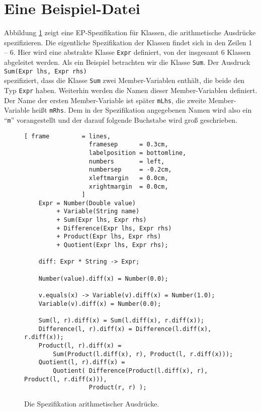 \section{Eine Beispiel-Datei}
Abbildung \ref{fig:expr.ep} zeigt eine EP-Spezifikation f\"ur Klassen, die arithmetische Ausdr\"ucke
spezifizieren.   Die eigentliche Spezifikation der Klassen findet sich in den Zeilen 1 -- 6.
Hier wird eine abstrakte Klasse \texttt{Expr} definiert, von der insgesamt 6 Klassen abgeleitet
werden.  Als ein Beispiel betrachten wir die Klasse \texttt{Sum}.  Der Ausdruck
\\[0.2cm]
\hspace*{1.3cm}
\texttt{Sum(Expr lhs, Expr rhs)}
\\[0.2cm]
spezifiziert, dass die Klasse \texttt{Sum} zwei Member-Variablen enth\"alt, die beide den Typ
\texttt{Expr} haben.  Weiterhin werden die Namen dieser Member-Variablen definiert.  Der Name der
ersten Member-Variable ist sp\"ater \texttt{mLhs}, die zweite Member-Variable hei{\ss}t \texttt{mRhs}.
Dem in der Spezifikation angegebenen Namen wird also ein ``\texttt{m}'' vorangestellt und der darauf
folgende Buchstabe wird gro{\ss} geschrieben.

\begin{figure}[thb]
  \centering
\begin{Verbatim}[ frame         = lines, 
                  framesep      = 0.3cm, 
                  labelposition = bottomline,
                  numbers       = left,
                  numbersep     = -0.2cm,
                  xleftmargin   = 0.0cm,
                  xrightmargin  = 0.0cm,
                ]
    Expr = Number(Double value)
         + Variable(String name)
         + Sum(Expr lhs, Expr rhs) 
         + Difference(Expr lhs, Expr rhs)
         + Product(Expr lhs, Expr rhs)     
         + Quotient(Expr lhs, Expr rhs);
    
    diff: Expr * String -> Expr;

    Number(value).diff(x) = Number(0.0);

    v.equals(x) -> Variable(v).diff(x) = Number(1.0);
    Variable(v).diff(x) = Number(0.0);

    Sum(l, r).diff(x) = Sum(l.diff(x), r.diff(x));
    Difference(l, r).diff(x) = Difference(l.diff(x), r.diff(x));
    Product(l, r).diff(x) = 
        Sum(Product(l.diff(x), r), Product(l, r.diff(x)));
    Quotient(l, r).diff(x) = 
        Quotient( Difference(Product(l.diff(x), r), Product(l, r.diff(x))), 
                  Product(r, r) );
\end{Verbatim} 
\vspace*{-0.3cm}
  \caption{Die Spezifikation arithmetischer Ausdr\"ucke.}
  \label{fig:expr.ep}
\end{figure} %

